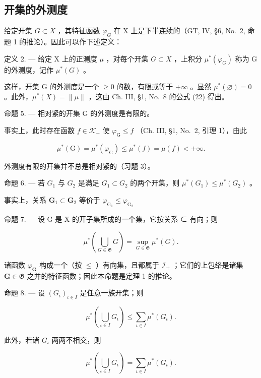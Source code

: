 \subsection{开集的外测度}

给定开集 \(G \subset X\) ，其特征函数 \(\varphi_{G}\) 在 X 上是下半连续的（GT, IV, §6, No.~2, 命题 1 的推论）。因此可以作下述定义：

定义 2. --- 给定 X 上的正测度 \(\mu\) ，对每个开集 \(G \subset X\) ，上积分 \(\mu^{*}(\varphi_{G})\) 称为 G 的外测度，记作 \(\mu^{*}(G)\) 。

这样，开集 G 的外测度是一个 \(\geqslant0\) 的数，有限或等于 \(+\infty\) 。显然 \(\mu^{*}(\varnothing)=0\) 。此外，\(\mu^{*}(X)=\|\mu\|\) ，这由 Ch. III, §1, No.~8 的公式 (22) 得出。

命题 5. --- 相对紧的开集 G 的外测度是有限的。

事实上，此时存在函数 \(f \in \mathcal{K}_+\) 使 \(\varphi_{\mathrm{G}} \leqslant f\) （Ch. III, §1, No.~2, 引理 1），由此

\[
\mu^ {*} (\mathrm{G}) = \mu^ {*} (\varphi_ {\mathrm{G}}) \leqslant \mu^ {*} (f) = \mu (f) <   + \infty .
\]

外测度有限的开集并不总是相对紧的（习题 3）。

命题 6. --- 若 \(G_1\) 与 \(G_2\) 是满足 \(G_1 \subset G_2\) 的两个开集，则 \(\mu^*(G_1) \leqslant \mu^*(G_2)\) 。

事实上，关系 \(\mathbf{G}_1\subset \mathbf{G}_2\) 等价于 \(\varphi_{\mathrm{G_1}}\leqslant \varphi_{\mathrm{G_2}}\)

命题 7. --- 设 G 是 X 的开子集所成的一个集，它按关系 ⊂ 有向；则

\[
\mu^ {*} \left(\bigcup_ {G \in \mathfrak {G}} G\right) = \sup _ {G \in \mathfrak {G}} \mu^ {*} (G).\tag{5}
\]

诸函数 \(\varphi_{\mathbf{G}}\) 构成一个（按 \(\leqslant\) ）有向集，且都属于 \(\mathcal{I}_{+}\) ；它们的上包络是诸集 \(\mathbf{G} \in \mathfrak{G}\) 之并的特征函数；因此本命题是定理 1 的推论。

命题 8. --- 设 \((G_{\iota})_{\iota \in I}\) 是任意一族开集；则

\[
\mu^ {*} \left(\bigcup_ {\iota \in I} G _ {\iota}\right) \leqslant \sum_ {\iota \in I} \mu^ {*} (G _ {\iota}).\tag{6}
\]

此外，若诸 \(G_{\iota}\) 两两不相交，则

\[
\mu^ {*} \left(\bigcup_ {\iota \in I} G _ {\iota}\right) = \sum_ {\iota \in I} \mu^ {*} (G _ {\iota}).\tag{7}
\]

